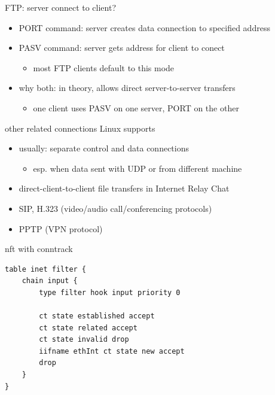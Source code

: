 \begin{frame}{FTP: server connect to client?}
\begin{itemize}
\item PORT command: server creates data connection to specified address
\item PASV command: server gets address for client to conect
    \begin{itemize}
    \item most FTP clients default to this mode
    \end{itemize}
\item why both: in theory, allows direct server-to-server transfers
    \begin{itemize}
    \item one client uses PASV on one server, PORT on the other
    \end{itemize}
\end{itemize}
\end{frame}

\begin{frame}{other related connections Linux supports}
    \begin{itemize}
    \item usually: separate control and data connections
        \begin{itemize}
        \item esp. when data sent with UDP or from different machine
        \end{itemize}
    \vspace{.5cm}
    \item direct-client-to-client file transfers in Internet Relay Chat
    \item SIP, H.323 (video/audio call/conferencing protocols)
    \item PPTP (VPN protocol)
    \end{itemize}
\end{frame}

\begin{frame}[fragile]{nft with conntrack}
\begin{Verbatim}
table inet filter {
    chain input {
        type filter hook input priority 0

        ct state established accept
        ct state related accept
        ct state invalid drop
        iifname ethInt ct state new accept
        drop
    }
}
\end{Verbatim}
\end{frame}

